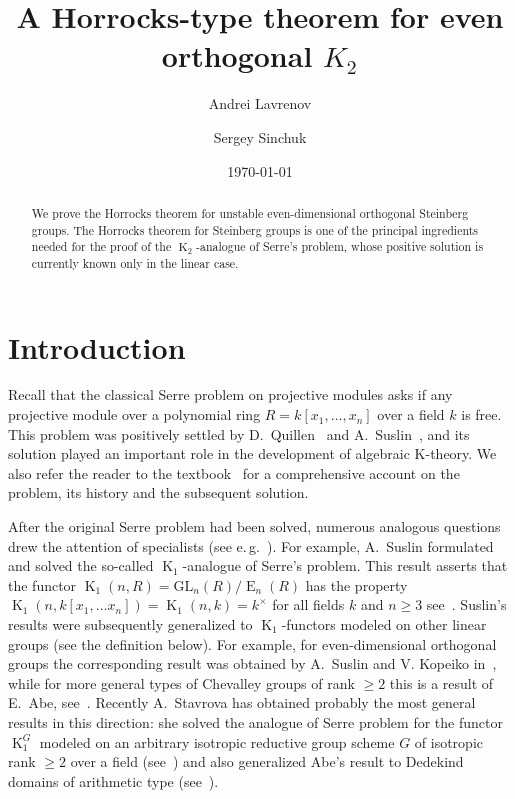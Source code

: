 \documentclass[oneside, 8pt]{amsart}
\title{A Horrocks-type theorem for even orthogonal $K_2$}
\author{Andrei Lavrenov}
\author {Sergey Sinchuk}
\date {\today}
\theoremstyle{remark}
\theoremstyle{definition}
\numberwithin{lemma}{section}
\numberwithin{prop}{section}
\numberwithin{corollary}{section}
\numberwithin{externaltheorem}{section}
\DeclareMathOperator{\E}{E}
\DeclareMathOperator{\K}{K}
\numberwithin{equation}{section}
\begin{document}
\begin{abstract} We prove the Horrocks theorem for unstable even-dimensional orthogonal Steinberg groups. The Horrocks theorem for Steinberg groups is one of the principal ingredients needed for the proof of the $\K_2$-analogue of Serre's problem,  whose positive solution is currently known only in the linear case. \end{abstract}
\maketitle
\section{Introduction}
Recall that the classical Serre problem on projective modules asks if any projective module over a polynomial ring $R = k[x_1,\ldots, x_n]$ over a field $k$ is free. This problem was positively settled by D.~Quillen~\cite{Qu76} and A.~Suslin~\cite{Su76}, and its solution played an important role in the development of algebraic K-theory. We also refer the reader to the textbook~\cite{Lam10} for a comprehensive account on the problem, its history and the subsequent solution.

After the original Serre problem had been solved, numerous analogous questions drew the attention of specialists (see e.\,g.~\cite{Su77, Su82, Abe83, Tu83, Lam10, St-poly, St-Ded}). For example, A.~Suslin formulated and solved the so-called $\K_1$-analogue of Serre's problem. This result asserts that the functor $\K_1(n, R) = \mathrm{GL}_{n}(R)/\E_n(R)$ has the property $\K_1(n, k[x_1, \ldots x_n]) = \K_1(n, k) = k^\times$ for all fields $k$ and $n \geq 3$ see~\cite[Corollary~7.11]{Su77}. Suslin's results were subsequently generalized to $\K_1$-functors modeled on other linear groups (see the definition below). For example, for even-dimensional orthogonal groups the corresponding result was obtained by A.~Suslin and V. Kopeiko in~\cite{Su82}, while for more general types of Chevalley groups of rank $\geq 2$ this is a result of E.~Abe, see~\cite{Abe83}. Recently A.~Stavrova has obtained probably the most general results in this direction: she solved the analogue of Serre problem for the functor $\K_1^G$ modeled on an arbitrary isotropic reductive group scheme $G$ of isotropic rank $\geq 2$ over a field (see~\cite[Theorem~1.2]{St-poly}) and also generalized Abe's result to Dedekind domains of arithmetic type (see~\cite[Corollary~1.2]{St-Ded}).
\end{document}
